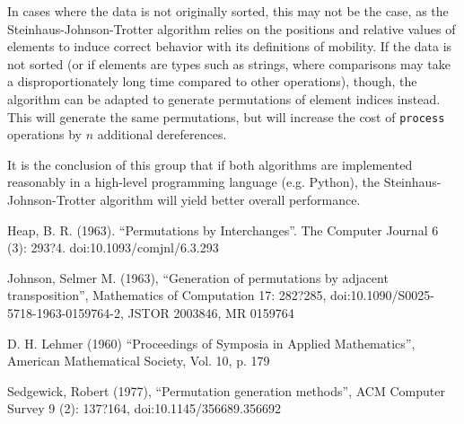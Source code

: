\documentclass[10pt, oneside]{article}   	%
\begin{document}
In cases where the data is not originally sorted, this may not be the case, as the Steinhaus-Johnson-Trotter algorithm relies on the positions and relative values of elements to induce correct behavior with its definitions of mobility. If the data is not sorted (or if elements are types such as strings, where comparisons may take a disproportionately long time compared to other operations), though, the algorithm can be adapted to generate permutations of element indices instead. This will generate the same permutations, but will increase the cost of \texttt{process} operations by $n$ additional dereferences.

It is the conclusion of this group that if both algorithms are implemented reasonably in a high-level programming language (e.g. Python), the Steinhaus-Johnson-Trotter algorithm will yield better overall performance.

\newpage
\begin{thebibliography}{9}
	Heap, B. R. (1963). ``Permutations by Interchanges''. The Computer Journal 6 (3): 293?4. doi:10.1093/comjnl/6.3.293
	
	Johnson, Selmer M. (1963), ``Generation of permutations by adjacent transposition'', Mathematics of Computation 17: 282?285, doi:10.1090/S0025-5718-1963-0159764-2, JSTOR 2003846, MR 0159764
	
	D. H. Lehmer (1960) ``Proceedings of Symposia in Applied Mathematics'', American Mathematical Society, Vol. 10, p. 179
	
	Sedgewick, Robert (1977), ``Permutation generation methods'', ACM Computer Survey 9 (2): 137?164, doi:10.1145/356689.356692
\end{thebibliography}
\end{document}
